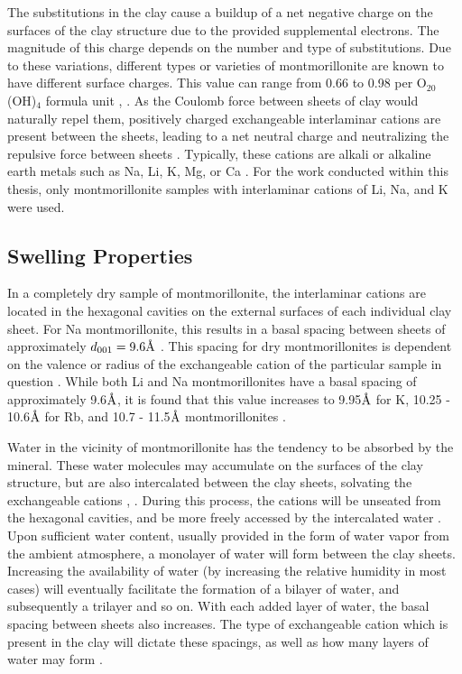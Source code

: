The substitutions in the clay cause a buildup of a net negative charge on the surfaces of the clay structure due to the provided supplemental electrons. The magnitude of this charge depends on the number and type of substitutions. Due to these variations, different types or varieties of montmorillonite are known to have different surface charges. This value can range from 0.66 to 0.98 per O$_{20}$(OH)$_4$ formula unit \cite{joshi2009mechanism}, \cite{newman1987chemical}. As the Coulomb force between sheets of clay would naturally repel them, positively charged exchangeable interlaminar cations are present between the sheets, leading to a net neutral charge and neutralizing the repulsive force between sheets \cite{mering1953role}. Typically, these cations are alkali or alkaline earth metals such as Na, Li, K, Mg, or Ca \cite{berend1995mechanism}. For the work conducted within this thesis, only montmorillonite samples with interlaminar cations of Li, Na, and K were used.

\subsection{Swelling Properties}
In a completely dry sample of montmorillonite, the interlaminar cations are located in the hexagonal cavities on the external surfaces of each individual clay sheet. For Na montmorillonite, this results in a basal spacing between sheets of approximately $d_{001}=9.6\text{\normalfont\AA}$ \cite{cases1992mechanism}. This spacing for dry montmorillonites is dependent on the valence or radius of the exchangeable cation of the particular sample in question \cite{mering1953role}. While both Li and Na montmorillonites have a basal spacing of approximately 9.6$\text{\normalfont\AA}$, it is found that this value increases to 9.95$\text{\normalfont\AA}$ for K, 10.25 - 10.6$\text{\normalfont\AA}$ for Rb, and 10.7 - 11.5$\text{\normalfont\AA}$ montmorillonites \cite{berend1995mechanism}.

Water in the vicinity of montmorillonite has the tendency to be absorbed by the mineral. These water molecules may accumulate on the surfaces of the clay structure, but are also intercalated between the clay sheets, solvating the exchangeable cations \cite{aldrich1944hydration}, \cite{mering1946hydration}. During this process, the cations will be unseated from the hexagonal cavities, and be more freely accessed by the intercalated water \cite{mering1953role}. Upon sufficient water content, usually provided in the form of water vapor from the ambient atmosphere, a monolayer of water will form between the clay sheets. Increasing the availability of water (by increasing the relative humidity in most cases) will eventually facilitate the formation of a bilayer of water, and subsequently a trilayer and so on. With each added layer of water, the basal spacing between sheets also increases. The type of exchangeable cation which is present in the clay will dictate these spacings, as well as how many layers of water may form \cite{mering1964gonflement}.

